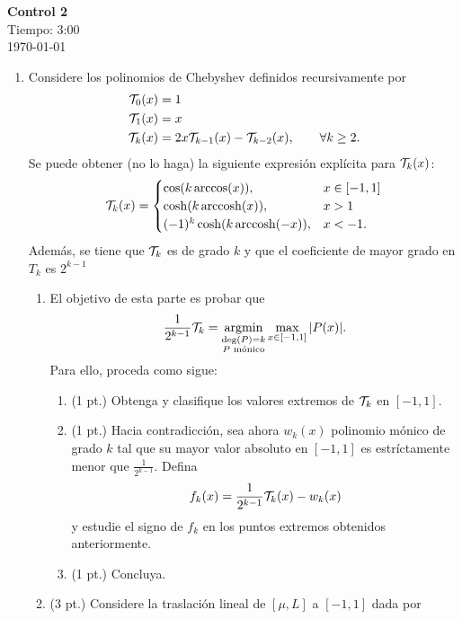 \documentclass{article}
\begin{document}


\begin{center}
    \Huge{\textbf{Control 2}}\\
    \normalsize
    Tiempo: 3:00\\
    \today
\end{center}

\begin{enumerate}
	\item Considere los polinomios de Chebyshev definidos recursivamente por
	\begin{align*}
        \mathcal{T}_0(x) &= 1 \\
        \mathcal{T}_1(x) &= x \\
        \mathcal{T}_k(x) &= 2x \mathcal{T}_{k-1}(x) - \mathcal{T}_{k-2}(x), \qquad \forall k \geq 2.
    \end{align*}
    Se puede obtener (no lo haga) la siguiente expresión explícita para \(\mathcal{T}_k(x)\):
    \[\mathcal{T}_k(x) = \begin{cases}
        \cos(k \arccos(x) ), & x \in [-1, 1] \\
        \cosh(k\operatorname{arccosh}(x)), & x > 1 \\
        (-1)^k \cosh(k\operatorname{arccosh}(-x)), & x < -1.
    \end{cases}\]
    Además, se tiene que \(\mathcal{T}_k\) es de grado \(k\) y que el coeficiente de mayor grado en \(T_k\) es \(2^{k-1}\)
    \begin{enumerate}
        \item El objetivo de esta parte es probar que
        \[\frac{1}{2^{k-1}}\mathcal{T}_k = \operatorname*{argmin}_{\substack{\deg(P) = k \\ P \text{ mónico}}} \max_{x \in [-1, 1]} |P(x)|.\]
        Para ello, proceda como sigue:
        \begin{enumerate}
            \item (1 pt.) Obtenga y clasifique los valores extremos de \(\mathcal{T}_k\) en \([-1, 1]\).
            \item (1 pt.) Hacia contradicción, sea ahora \(w_k(x)\) polinomio mónico de grado \(k\) tal que su mayor valor absoluto en \([-1, 1]\) es estríctamente menor que \(\frac{1}{2^{k-1}}\). Defina
            \[f_k(x) = \frac{1}{2^{k-1}}\mathcal{T}_k(x) - w_k(x)\]
            y estudie el signo de \(f_k\) en los puntos extremos obtenidos anteriormente.
            \item (1 pt.) Concluya.
        \end{enumerate}
        \item (3 pt.) Considere la traslación lineal de \([\mu, L]\) a \([-1, 1]\) dada por

\end{enumerate}
\end{enumerate}
\end{document}
